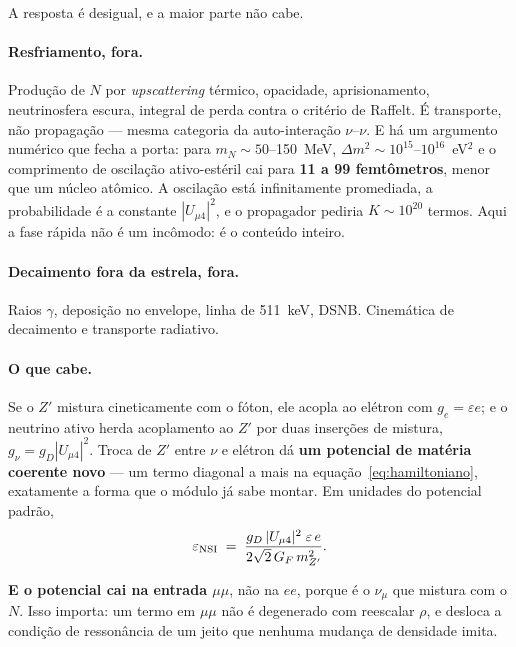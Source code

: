 A resposta é desigual, e a maior parte não cabe.

\paragraph{Resfriamento, fora.} Produção de $N$ por \emph{upscattering} térmico,
opacidade, aprisionamento, neutrinosfera escura, integral de perda contra o
critério de Raffelt. É transporte, não propagação --- mesma categoria da
auto-interação $\nu$--$\nu$. E há um argumento numérico que fecha a porta: para
$m_N \sim 50$--150~MeV, $\Delta m^2 \sim 10^{15}$--$10^{16}$~eV$^2$ e o
comprimento de oscilação ativo-estéril cai para \textbf{11 a 99 femtômetros},
menor que um núcleo atômico. A oscilação está infinitamente promediada, a
probabilidade é a constante $|U_{\mu4}|^2$, e o propagador pediria
$K\sim10^{20}$ termos. Aqui a fase rápida não é um incômodo: é o conteúdo
inteiro.

\paragraph{Decaimento fora da estrela, fora.} Raios $\gamma$, deposição no
envelope, linha de 511~keV, DSNB. Cinemática de decaimento e transporte
radiativo.

\paragraph{O que cabe.} Se o $Z'$ mistura cineticamente com o fóton, ele acopla
ao elétron com $g_e = \varepsilon e$; e o neutrino ativo herda acoplamento ao
$Z'$ por duas inserções de mistura, $g_\nu = g_D |U_{\mu4}|^2$. Troca de $Z'$
entre $\nu$ e elétron dá \textbf{um potencial de matéria coerente novo} --- um
termo diagonal a mais na equação~\eqref{eq:hamiltoniano}, exatamente a forma
que o módulo já sabe montar. Em unidades do potencial padrão,
\begin{equation}
  \varepsilon_{\rm NSI} \;=\;
    \frac{g_D\,|U_{\mu4}|^2\;\varepsilon\,e}{2\sqrt{2}\,G_F\,m_{Z'}^2}.
\label{eq:eps-nsi}
\end{equation}

\textbf{E o potencial cai na entrada $\mu\mu$}, não na $ee$, porque é o $\nu_\mu$
que mistura com o $N$. Isso importa: um termo em $\mu\mu$ não é degenerado com
reescalar $\rho$, e desloca a condição de ressonância de um jeito que nenhuma
mudança de densidade imita.

